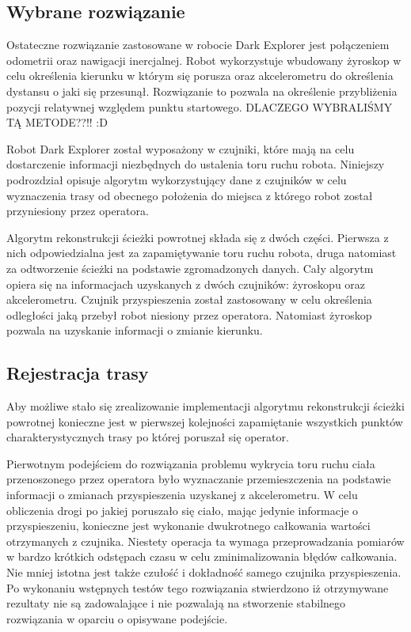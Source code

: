 \subsection{Wybrane rozwiązanie}
Ostateczne rozwiązanie zastosowane w robocie Dark Explorer jest połączeniem odometrii oraz nawigacji inercjalnej. Robot wykorzystuje wbudowany żyroskop w celu określenia kierunku w którym się porusza oraz akcelerometru do określenia dystansu o jaki się przesunął. Rozwiązanie to pozwala na określenie przybliżenia pozycji relatywnej względem punktu startowego. DLACZEGO WYBRALIŚMY TĄ METODE??!! :D

Robot Dark Explorer został wyposażony w czujniki, które mają na celu dostarczenie
informacji niezbędnych do ustalenia toru ruchu robota. Niniejszy podrozdział
opisuje algorytm wykorzystujący dane z czujników w celu wyznaczenia trasy od
obecnego położenia do miejsca z którego robot został przyniesiony przez
operatora.

Algorytm rekonstrukcji ścieżki powrotnej składa się z dwóch części. Pierwsza z
nich odpowiedzialna jest za zapamiętywanie toru ruchu robota, druga natomiast za
odtworzenie ścieżki na podstawie zgromadzonych danych. Cały algorytm opiera się
na informacjach uzyskanych z dwóch czujników: żyroskopu oraz akcelerometru.
Czujnik przyspieszenia został zastosowany w celu określenia odległości jaką
przebył robot niesiony przez operatora. Natomiast żyroskop pozwala na uzyskanie
informacji o zmianie kierunku.

\subsection{Rejestracja trasy}
Aby możliwe stało się zrealizowanie implementacji algorytmu rekonstrukcji
ścieżki powrotnej konieczne jest w pierwszej kolejności zapamiętanie wszystkich
punktów charakterystycznych trasy po której poruszał się operator.

Pierwotnym podejściem do rozwiązania problemu wykrycia toru ruchu ciała
przenoszonego przez operatora było wyznaczanie przemieszczenia na
podstawie informacji o zmianach przyspieszenia uzyskanej z akcelerometru.
W celu obliczenia drogi po jakiej poruszało się ciało, mając jedynie informacje 
o przyspieszeniu, konieczne jest wykonanie dwukrotnego całkowania wartości 
otrzymanych z czujnika. Niestety operacja ta wymaga przeprowadzania pomiarów w
bardzo krótkich odstępach czasu w celu zminimalizowania błędów całkowania.
Nie mniej istotna jest także czułość i dokładność samego czujnika
przyspieszenia. Po wykonaniu wstępnych testów tego rozwiązania stwierdzono iż
otrzymywane rezultaty nie są zadowalające  i nie pozwalają na stworzenie
stabilnego rozwiązania w oparciu o opisywane podejście. 

